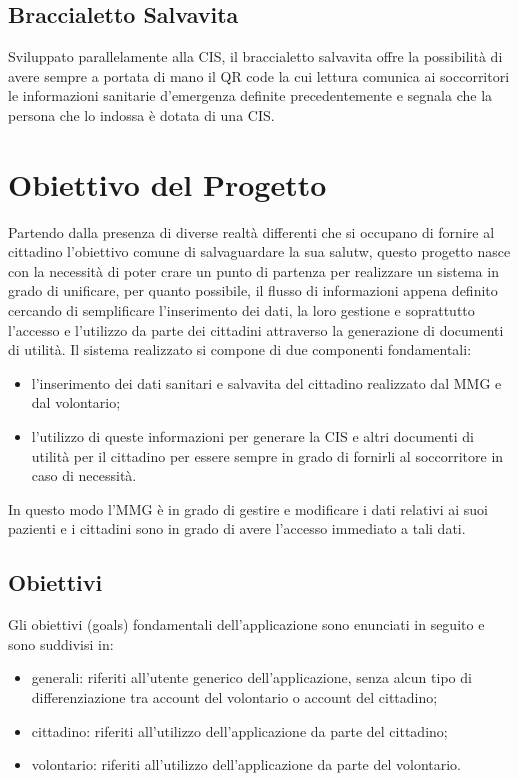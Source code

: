 \documentclass[12pt,a4paper,twoside,openright,titlepage]{book}
\begin{document}
\subsection{Braccialetto Salvavita}
Sviluppato parallelamente alla CIS, il braccialetto salvavita offre la possibilità di avere sempre a portata di mano il QR code la cui lettura comunica ai soccorritori le informazioni sanitarie d'emergenza definite precedentemente e segnala che la persona che lo indossa è dotata di una CIS.

\section{Obiettivo del Progetto}
Partendo dalla presenza di diverse realtà differenti che si occupano di fornire al cittadino l'obiettivo comune di salvaguardare la sua salutw, questo progetto nasce con la necessità di poter crare un punto di partenza per realizzare un sistema in grado di unificare, per quanto possibile, il flusso di informazioni appena definito cercando di semplificare l'inserimento dei dati, la loro gestione e  soprattutto l'accesso e l'utilizzo da parte dei cittadini attraverso la generazione di documenti di utilità.
Il sistema realizzato si compone di due componenti fondamentali:
\begin{itemize}
\item l'inserimento dei dati sanitari e salvavita del cittadino realizzato dal MMG e dal volontario;
\item l'utilizzo di queste informazioni per generare la CIS e altri documenti di utilità per il cittadino per essere sempre in grado di fornirli al soccorritore in caso di necessità.
\end{itemize}
In questo modo l'MMG è in grado di gestire e modificare i dati relativi ai suoi pazienti e i cittadini sono in grado di avere l'accesso immediato a tali dati.

\subsection{Obiettivi}
Gli obiettivi (goals) fondamentali dell'applicazione sono enunciati in seguito e sono suddivisi in:
\begin{itemize}
\item generali: riferiti all'utente generico dell'applicazione, senza alcun tipo di differenziazione tra account del volontario o account del cittadino;
\item cittadino: riferiti all'utilizzo dell'applicazione da parte del cittadino;
\item volontario: riferiti all'utilizzo dell'applicazione da parte del volontario.
\end{itemize}
\end{document}
